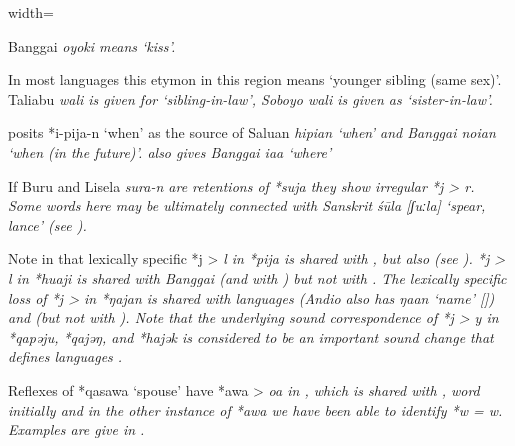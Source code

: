 \begin{table}
\begin{adjustbox}{width=\textwidth}
\begin{threeparttable}
\begin{tablenotes}
			\item[†]	{Banggai \it{oyoki} means ‘kiss’.}
			\item[‡]	{In most languages this etymon in this region means ‘younger sibling (same sex)’.
								Taliabu \it{wali} is given for ‘sibling-in-law’,
								Soboyo \it{wali} is given as ‘sister-in-law’.}
			\item[Δ]	{\citet[132]{Mead2003a} posits *i-pija-n ‘when’ as the source
								of Saluan \it{hipian} ‘when’
								and Banggai \it{noian} ‘when (in the future)’.
								\citet[151]{Bergh1953} also gives Banggai \it{iaa} ‘where’}
			\item[{ǁ}]	{If Buru
								and Lisela \it{sura-n} are retentions of *suja they show irregular *j > \it{r}.
								Some words here may be ultimately connected with Sanskrit \it{śūla}
								[ʃuːla] ‘spear, lance’ (see \citealp[568]{Hoogervorst2016}).}
		\end{tablenotes}
	\end{threeparttable}
\end{adjustbox}
\end{table}

Note in  that lexically specific *j > \it{l} in *pija
is shared with ,
but also  (see ).
*j > \it{l} in *huaji is shared with Banggai (and with )
but not with .
The lexically specific loss of *j > {\0} in *ŋajan is shared
with  languages (Andio also has \it{ŋaan}
‘name’ [\citealp[76]{Mead2003b}]) and  (but not with ).
Note that the underlying sound correspondence of *j > \it{y}
in *qapəju, *qajəŋ, and *hajək is considered to be an important sound change
that defines  languages \citep{Mead2003a}.

Reflexes of *qasawa ‘spouse’ have *awa > \it{oa} in ,
which is shared with  \citep[72f, 83]{Mead2003b},
word initially and in the other instance of *awa we have
been able to identify *w = \it{w}.
Examples are give in .


